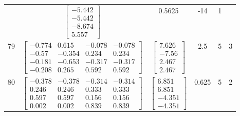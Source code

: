 \documentclass[a4paper,12pt]{article}
\begin{document}
\begin{tabular}{c c c c c c}
&
$\begin{bmatrix} -5.442 \\ -5.442 \\ -8.674 \\ 5.557 \end{bmatrix}$
&
0.5625
&
-14
&
1
\\
79
&
$\begin{bmatrix} -0.774 & 0.615 & -0.078 & -0.078 \\ -0.57 & -0.354 & 0.234 & 0.234 \\ -0.181 & -0.653 & -0.317 & -0.317 \\ -0.208 & 0.265 & 0.592 & 0.592 \end{bmatrix}$
&
$\begin{bmatrix} 7.626 \\ -7.56 \\ 2.467 \\ 2.467 \end{bmatrix}$
&
2.5
&
5
&
3
\\
80
&
$\begin{bmatrix} -0.378 & -0.378 & -0.314 & -0.314 \\ 0.246 & 0.246 & 0.333 & 0.333 \\ 0.597 & 0.597 & 0.156 & 0.156 \\ 0.002 & 0.002 & 0.839 & 0.839 \end{bmatrix}$
&
$\begin{bmatrix} 6.851 \\ 6.851 \\ -4.351 \\ -4.351 \end{bmatrix}$
&
0.625
&
5
&
2
\\
\end{tabular} \egroup \newpage
\end{document}
